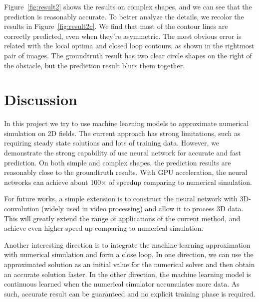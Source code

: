 \documentclass[12pt]{article}
\begin{document}
Figure~\ref{fig:result2} shows the results on complex shapes, and we can see that the prediction is reasonably accurate.
To better analyze the details, we recolor the results in Figure~\ref{fig:result2c}. We find that most of the contour lines are correctly predicted, even when they're asymmetric.
The most obvious error is related with the local optima and closed loop contours, as shown in the rightmost pair of images.
The groundtruth result has two clear circle shapes on the right of the obstacle, but the prediction result blurs them together.

\section{Discussion}

In this project we try to use machine learning models to approximate numerical simulation on 2D fields.
The current approach has strong limitations, such as requiring steady state solutions and lots of training data.
However, we demonstrate the strong capability of use neural network for accurate and fast prediction.
On both simple and complex shapes, the prediction results are reasonably close to the groundtruth results.
With GPU acceleration, the neural networks can achieve about 100$\times$ of speedup comparing to numerical simulation.

For future works, a simple extension is to construct the neural network with 3D-convolution (widely used in video processing) and allow it to process 3D data.
This will greatly extend the range of applications of the current method, and achieve even higher speed up comparing to numerical simulation.

Another interesting direction is to integrate the machine learning approximation with numerical simulation and form a close loop.
In one direction, we can use the approximated solution as an initial value for the numerical solver and then obtain an accurate solution faster.
In the other direction, the machine learning model is continuous learned when the numerical simulator accumulates more data.
As such, accurate result can be guaranteed and no explicit training phase is required.



\end{document}
